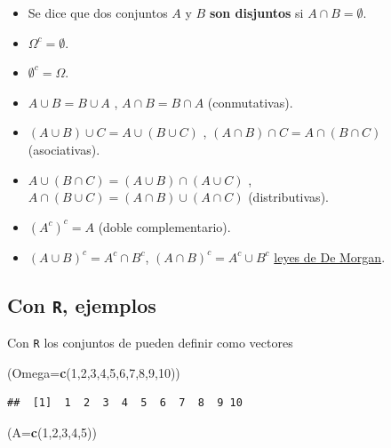 \documentclass[]{book}
\newenvironment{Shaded}{\begin{snugshade}}{\end{snugshade}}
\newcommand{\DataTypeTok}[1]{\textcolor[rgb]{0.13,0.29,0.53}{#1}}
\newcommand{\DecValTok}[1]{\textcolor[rgb]{0.00,0.00,0.81}{#1}}
\newcommand{\KeywordTok}[1]{\textcolor[rgb]{0.13,0.29,0.53}{\textbf{#1}}}
\newcommand{\NormalTok}[1]{#1}
\providecommand{\tightlist}{%
  \setlength{\itemsep}{0pt}\setlength{\parskip}{0pt}}
\begin{document}
\begin{itemize}
\tightlist
\item
  Se dice que dos conjuntos \(A\) y \(B\) \textbf{son disjuntos} si \(A\cap B=\emptyset.\)
\item
  \(\Omega^c=\emptyset\).
\item
  \(\emptyset^c=\Omega\).
\item
  \(A\cup B=B \cup A\) , \(A\cap B=B\cap A\) (conmutativas).
\item
  \((A\cup B) \cup C = A \cup( B \cup C)\) , \((A\cap B) \cap C = A \cap( B \cap C)\) (asociativas).
\item
  \(A\cup (B\cap C)=(A\cup B) \cap (A\cup C)\) , \(A\cap (B\cup C)=(A\cap B) \cup (A\cap C)\) (distributivas).
\item
  \(\left(A^c\right)^c=A\) (doble complementario).
\item
  \(\left(A\cup B\right)^c=A^c \cap B^c\), \(\left(A\cap B\right)^c=A^c \cup B^c\) \href{https://es.wikipedia.org/wiki/Leyes_de_De_Morgan}{leyes de De Morgan}.
\end{itemize}

\hypertarget{con-r-ejemplos}{%
\subsection{\texorpdfstring{Con \texttt{R}, ejemplos}{Con R, ejemplos}}\label{con-r-ejemplos}}

Con \texttt{R} los conjuntos de pueden definir como vectores

\begin{Shaded}
\begin{Highlighting}[]
\NormalTok{(}\DataTypeTok{Omega=}\KeywordTok{c}\NormalTok{(}\DecValTok{1}\NormalTok{,}\DecValTok{2}\NormalTok{,}\DecValTok{3}\NormalTok{,}\DecValTok{4}\NormalTok{,}\DecValTok{5}\NormalTok{,}\DecValTok{6}\NormalTok{,}\DecValTok{7}\NormalTok{,}\DecValTok{8}\NormalTok{,}\DecValTok{9}\NormalTok{,}\DecValTok{10}\NormalTok{))}
\end{Highlighting}
\end{Shaded}

\begin{verbatim}
##  [1]  1  2  3  4  5  6  7  8  9 10
\end{verbatim}

\begin{Shaded}
\begin{Highlighting}[]
\NormalTok{(}\DataTypeTok{A=}\KeywordTok{c}\NormalTok{(}\DecValTok{1}\NormalTok{,}\DecValTok{2}\NormalTok{,}\DecValTok{3}\NormalTok{,}\DecValTok{4}\NormalTok{,}\DecValTok{5}\NormalTok{))}
\end{Highlighting}
\end{Shaded}
\end{document}
